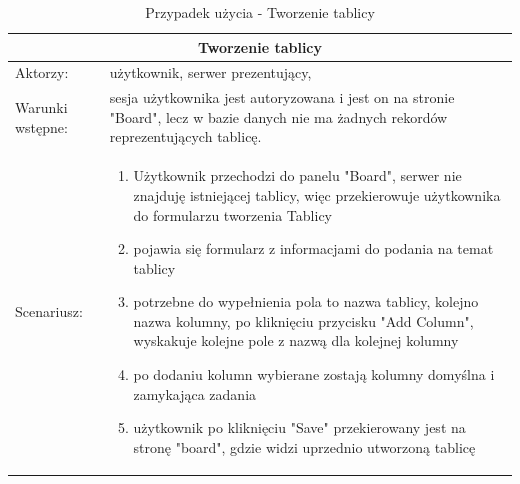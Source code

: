 \begin{table}[h!]
	\begin{tabular}{ |p{2cm}||p{13cm}|  }
		
		\hline
		\multicolumn{2}{|c|}{Tworzenie tablicy} \\
		\hline
		Aktorzy: &użytkownik, serwer prezentujący,\\
		\hline
		Warunki wstępne: &sesja użytkownika jest autoryzowana i jest on na stronie "Board", lecz w bazie danych nie ma żadnych rekordów reprezentujących tablicę.\\
		\hline
		Scenariusz: &
		
		\begin{enumerate}
			\item Użytkownik przechodzi do panelu "Board", serwer nie znajduję istniejącej tablicy, więc przekierowuje użytkownika do formularzu tworzenia Tablicy
			\item pojawia się formularz z informacjami do podania na temat tablicy
			\item potrzebne do wypełnienia pola to nazwa tablicy, kolejno nazwa kolumny, po kliknięciu przycisku "Add Column", wyskakuje kolejne pole z nazwą dla kolejnej kolumny
			\item po dodaniu kolumn wybierane zostają kolumny domyślna i zamykająca zadania
			\item użytkownik po kliknięciu "Save" przekierowany jest na stronę "board", gdzie widzi uprzednio utworzoną tablicę
		\end{enumerate}\\
		\hline
	\end{tabular}
	\caption{Przypadek użycia -  Tworzenie tablicy}
\end{table}


